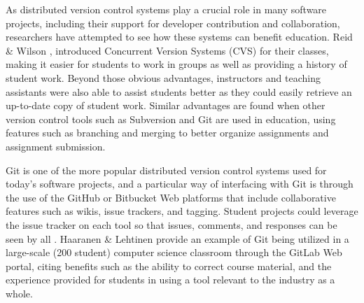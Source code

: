 As distributed version control systems play a crucial role in many software projects, including their support for developer contribution and collaboration, researchers have attempted to see how these systems can benefit education. Reid \& Wilson \cite{reid2005learning}, introduced Concurrent Version Systems (CVS) for their classes, making it easier for students to work in groups as well as providing a history of student work. Beyond those obvious advantages, instructors and teaching assistants were also able to assist students better as they could easily retrieve an up-to-date copy of student work. Similar advantages are found when other version control tools such as Subversion \cite{clifton2007subverting} and Git \cite{griffin2013github} are used in education, using features such as branching and merging to better organize assignments and assignment submission.

Git is one of the more popular distributed version control systems used for today's software projects, and a particular way of interfacing with Git is through the use of the GitHub or Bitbucket Web platforms that include collaborative features such as wikis, issue trackers, and tagging. Student projects could leverage the issue tracker on each tool so that issues, comments, and responses can be seen by all \cite{kelleher2014employing}. Haaranen & Lehtinen \cite{haaranen2015teaching} provide an example of Git being utilized in a large-scale (200 student) computer science classroom through the GitLab Web portal, citing benefits such as the ability to correct course material, and the experience provided for students in using a tool relevant to the industry as a whole.





